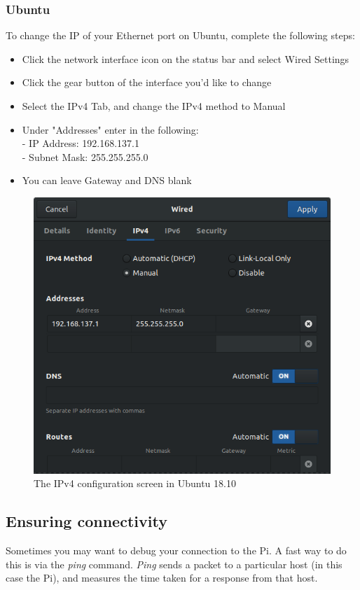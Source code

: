 \subsubsection{Ubuntu}
To change the IP of your Ethernet port on Ubuntu, complete the following steps:
\begin{itemize}
    \item Click the network interface icon on the status bar and select Wired Settings
    \item Click the gear button of the interface you'd like to change
    \item Select the IPv4 Tab, and change the IPv4 method to Manual
    \item Under "Addresses" enter in the following:\\
            - IP Address: 192.168.137.1\\
            - Subnet Mask: 255.255.255.0
    \item You can leave Gateway and DNS blank
\end{itemize}

\begin{figure}[H]
\centering
\includegraphics[width=0.6\columnwidth]{Figures/ubuntustaticip}
\caption{The IPv4 configuration screen in Ubuntu 18.10}
\label{fig:ubuntustaticip}
\end{figure}

\subsection{Ensuring connectivity}
\label{sec:Connectivity-EnsuringConnectivity}
Sometimes you may want to debug your connection to the Pi. A fast way to do this is via the \textit{ping} command. \textit{Ping} sends a packet to a particular host (in this case the Pi), and measures the time taken for a response from that host. 

